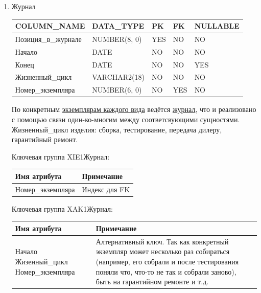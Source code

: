 \begin{enumerate}
\begin{tabular}{|p{7cm}|p{9.3cm}|}
    \end{tabular}

    \item{Журнал}

    \begin{tabular}{|p{7cm}|p{3cm}|p{1cm}|p{1cm}|p{3cm}|} \hline

        {\bf COLUMN\_NAME} & {\bf DATA\_TYPE} & {\bf PK} & {\bf FK} & {\bf NULLABLE} \\ \hline
        Позиция\_в\_журнале & NUMBER(8, 0) & YES & NO & NO \\ \hline
        Начало & DATE & NO & NO & NO \\ \hline
        Конец & DATE & NO & NO & YES \\ \hline
        Жизненный\_цикл & VARCHAR2(18) & NO & NO & NO \\ \hline
        Номер\_экземпляра & NUMBER(6, 0) & NO & YES & NO \\ \hline

    \end{tabular}

    По конкретным \underline{экземплярам каждого вида} ведётся \underline{журнал}, что и реализовано с помощью связи один-ко-многим между соответсвующими сущностями.
    Жизненный\_цикл изделия: сборка, тестирование, передача дилеру, гарантийный ремонт.

    Ключевая группа XIE1Журнал:

    \begin{tabular}{|p{7cm}|p{9.3cm}|} \hline

        {\bf Имя атрибута} & {\bf Примечание} \\ \hline
        Номер\_экземпляра & Индекс для FK \\ \hline

    \end{tabular}

    Ключевая группа XAK1Журнал:

    \begin{tabular}{|p{7cm}|p{9.3cm}|} \hline

        {\bf Имя атрибута} & {\bf Примечание} \\ \hline
        Начало \newline Жизенный\_цикл \newline Номер\_экземпляра & Алтернативный ключ.
        Так как конкретный экземпляр может несколько раз собираться (например, его собрали и после тестирования поняли что, что-то не так и собрали заново), быть на гарантийном ремонте и т.д. \\ \hline

    \end{tabular}

\end{enumerate}

